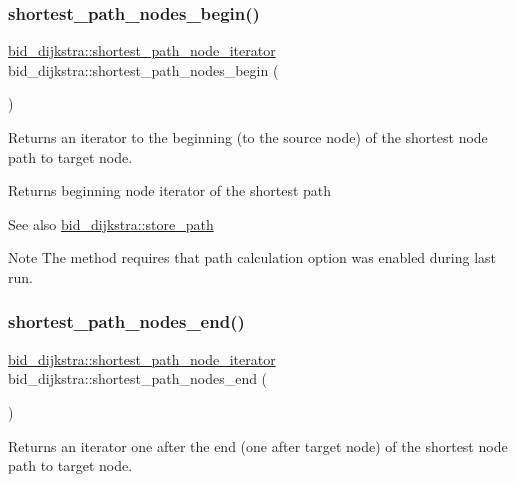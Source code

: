 \subsubsection{\texorpdfstring{shortest\+\_\+path\+\_\+nodes\+\_\+begin()}{shortest\_path\_nodes\_begin()}}
{\footnotesize\ttfamily \mbox{\hyperlink{classbid__dijkstra_ada2e642d9f0582d30fe1dd51c4aa1899}{bid\+\_\+dijkstra\+::shortest\+\_\+path\+\_\+node\+\_\+iterator}} bid\+\_\+dijkstra\+::shortest\+\_\+path\+\_\+nodes\+\_\+begin (\begin{DoxyParamCaption}{ }\end{DoxyParamCaption})}



Returns an iterator to the beginning (to the source node) of the shortest node path to target node. 

\begin{DoxyReturn}{Returns}
beginning node iterator of the shortest path
\end{DoxyReturn}
\begin{DoxySeeAlso}{See also}
\mbox{\hyperlink{classbid__dijkstra_a0032d9b44c8b3f6f5733ff3ef94cf169}{bid\+\_\+dijkstra\+::store\+\_\+path}}
\end{DoxySeeAlso}
\begin{DoxyNote}{Note}
The method requires that path calculation option was enabled during last run. 
\end{DoxyNote}
\mbox{\label{classbid__dijkstra_af06035d39e06a70a1c44f1c60c347c5a}} 
\subsubsection{\texorpdfstring{shortest\+\_\+path\+\_\+nodes\+\_\+end()}{shortest\_path\_nodes\_end()}}
{\footnotesize\ttfamily \mbox{\hyperlink{classbid__dijkstra_ada2e642d9f0582d30fe1dd51c4aa1899}{bid\+\_\+dijkstra\+::shortest\+\_\+path\+\_\+node\+\_\+iterator}} bid\+\_\+dijkstra\+::shortest\+\_\+path\+\_\+nodes\+\_\+end (\begin{DoxyParamCaption}{ }\end{DoxyParamCaption})}



Returns an iterator one after the end (one after target node) of the shortest node path to target node. 

